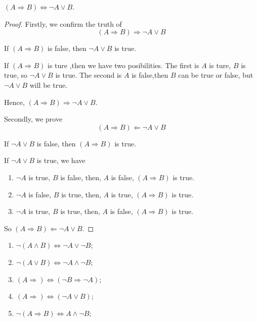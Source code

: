 \begin{question}
    $(A \Rightarrow B)\Leftrightarrow\lnot A \vee B$.
\end{question}
\begin{proof}
    Firstly, we confirm the truth of \[(A \Rightarrow B)\Rightarrow\lnot A \vee B\]

    If $(A \Rightarrow B)$ is false, then $\lnot A \vee B$ is true.

    If $(A \Rightarrow B)$ is ture ,then we have two posibilities. The first is $A$ is ture, $B$ is true, so $\lnot A \vee B$ is true. The second is $A$ is false,then $B$ can be true or false, but $\lnot A \vee B$ will be true.

    Hence, $(A \Rightarrow B)\Rightarrow\lnot A \vee B$.

    Secondly, we prove \[(A \Rightarrow B)\Leftarrow\lnot A \vee B\]

    If $\lnot A \vee B$ is false, then $(A \Rightarrow B)$ is true.

    If $\lnot A \vee B$ is true, we have
    \begin{enumerate}
        \item $\lnot A$ is true, $B$ is false, then, $A$ is false, $(A \Rightarrow B)$ is true.
        \item $\lnot A$ is false, $B$ is true, then, $A$ is true, $(A \Rightarrow B)$ is true.
        \item $\lnot A$ is true, $B$ is true, then, $A$ is false, $(A \Rightarrow B)$ is true.
    \end{enumerate}

    So $(A \Rightarrow B)\Leftarrow\lnot A \vee B$.
\end{proof}

\begin{tips}
    
    \begin{enumerate}
        \item $\lnot(A\wedge B)\Leftrightarrow\lnot A\vee \lnot B$;
        \item $\lnot(A\vee B)\Leftrightarrow\lnot A\wedge \lnot B$;
        \item $(A\Rightarrow)\Leftrightarrow(\lnot B\Rightarrow\lnot A)$;
        \item $(A\Rightarrow)\Leftrightarrow(\lnot A\vee B)$;
        \item $\lnot(A\Rightarrow B)\Leftrightarrow A\wedge\lnot B$;
    \end{enumerate}
\end{tips}